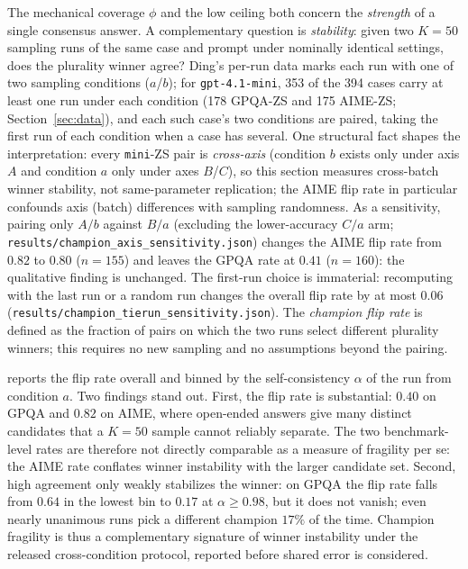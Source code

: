 \documentclass{article}
\begin{document}
The mechanical coverage $\phi$ and the low ceiling both concern the
\emph{strength} of
a single consensus answer. A complementary question is \emph{stability}:
given two $K=50$ sampling runs of the same case and prompt under nominally identical settings,
does the plurality winner agree? Ding's per-run data marks each run with
one of two sampling conditions ($a$/$b$); for \texttt{gpt-4.1-mini}, 353
of the 394 cases carry at least one run under each condition (178 GPQA-ZS
and 175 AIME-ZS; Section~\ref{sec:data}), and each such case's two conditions are paired,
taking the first run of each condition when a case has several. One structural fact shapes the interpretation: every \texttt{mini}-ZS pair is \emph{cross-axis} (condition $b$ exists only under axis $A$ and condition $a$ only under axes $B$/$C$), so this section measures cross-batch winner stability, not same-parameter replication; the AIME flip rate in particular confounds axis (batch) differences with sampling randomness. As a sensitivity, pairing only $A/b$ against $B/a$ (excluding the lower-accuracy $C/a$ arm; \texttt{results/champion\_axis\_sensitivity.json}) changes the AIME flip rate from $0.82$ to $0.80$ ($n=155$) and leaves the GPQA rate at $0.41$ ($n=160$): the qualitative finding is unchanged. The first-run choice is immaterial: recomputing with the last
run or a random run changes the overall flip rate by at most $0.06$ (\texttt{results/champion\_tierun\_sensitivity.json}).
The \emph{champion flip rate} is defined as the
fraction of pairs on which the two runs select different plurality
winners; this requires no new sampling and no assumptions beyond
the pairing.

 reports the flip rate overall and binned by the
self-consistency $\alpha$ of the run from condition $a$. Two findings stand out. First,
the flip rate is substantial: $0.40$ on GPQA and $0.82$ on AIME, where
open-ended answers give many distinct candidates that a $K=50$ sample
cannot reliably separate. The two benchmark-level rates are therefore
not directly comparable as a measure of fragility per se: the AIME rate
conflates winner instability with the larger candidate set. Second, high agreement only weakly stabilizes
the winner: on GPQA the flip rate falls from $0.64$ in the lowest bin to
$0.17$ at $\alpha\geq0.98$, but it does not vanish; even nearly unanimous
runs pick a different champion $17\%$ of the time. Champion fragility is
thus a complementary signature of winner instability under the
released cross-condition protocol, reported before shared error is
considered.
\end{document}
